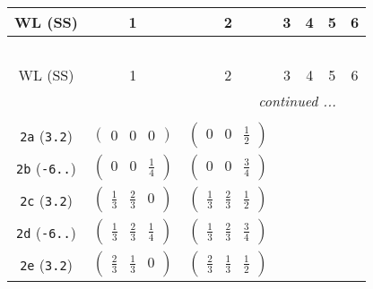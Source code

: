 \documentclass[fleqn,9pt,landscape]{jsarticle}
\begin{document}
\begin{center}
\renewcommand{\arraystretch}{1.2}
\begin{longtable}{ccccccc}
 \hline \hline
WL (SS) & 1 & 2 & 3 & 4 & 5 & 6 \\ \hline \endfirsthead

\multicolumn{6}{l}{\tablename\ \thetable{}} \\
 \hline \hline
WL (SS) & 1 & 2 & 3 & 4 & 5 & 6 \\ \hline \endhead

 \hline \hline
\multicolumn{6}{r}{\footnotesize\it continued ...} \\ \endfoot

 \hline \hline
\multicolumn{6}{r}{} \\ \endlastfoot

{\tt 2a} ({\tt 3.2}) & $ \begin{pmatrix} 0 & 0 & 0 \end{pmatrix} $ & $ \begin{pmatrix} 0 & 0 & \frac{1}{2} \end{pmatrix} $ & $  $ & $  $ & $  $ & $  $ \\ \hline
{\tt 2b} ({\tt -6..}) & $ \begin{pmatrix} 0 & 0 & \frac{1}{4} \end{pmatrix} $ & $ \begin{pmatrix} 0 & 0 & \frac{3}{4} \end{pmatrix} $ & $  $ & $  $ & $  $ & $  $ \\ \hline
{\tt 2c} ({\tt 3.2}) & $ \begin{pmatrix} \frac{1}{3} & \frac{2}{3} & 0 \end{pmatrix} $ & $ \begin{pmatrix} \frac{1}{3} & \frac{2}{3} & \frac{1}{2} \end{pmatrix} $ & $  $ & $  $ & $  $ & $  $ \\ \hline
{\tt 2d} ({\tt -6..}) & $ \begin{pmatrix} \frac{1}{3} & \frac{2}{3} & \frac{1}{4} \end{pmatrix} $ & $ \begin{pmatrix} \frac{1}{3} & \frac{2}{3} & \frac{3}{4} \end{pmatrix} $ & $  $ & $  $ & $  $ & $  $ \\ \hline
{\tt 2e} ({\tt 3.2}) & $ \begin{pmatrix} \frac{2}{3} & \frac{1}{3} & 0 \end{pmatrix} $ & $ \begin{pmatrix} \frac{2}{3} & \frac{1}{3} & \frac{1}{2} \end{pmatrix} $ & $  $ & $  $ & $  $ & $  $ \\ \hline

\end{longtable}
\end{center}
\end{document}
